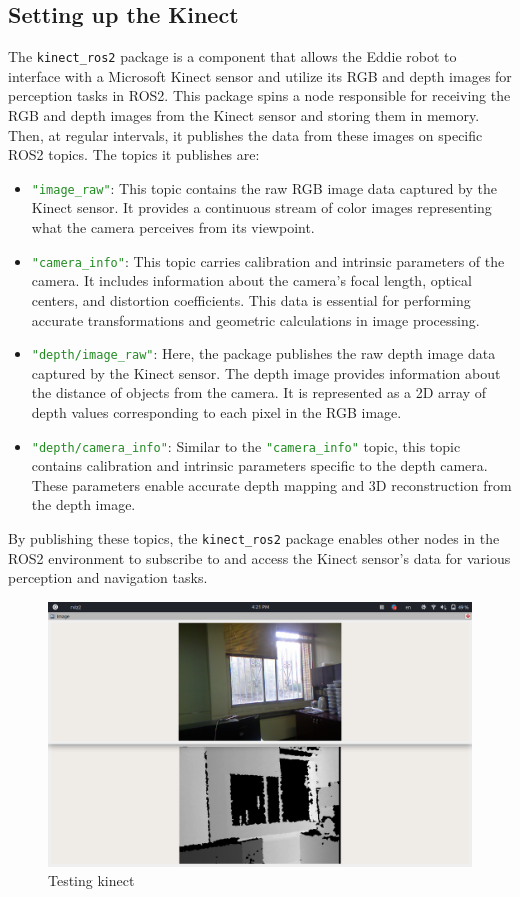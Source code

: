 \subsection{Setting up the Kinect}
The \texttt{kinect\_ros2} package is a component that allows the Eddie robot to interface with a Microsoft Kinect sensor and utilize its RGB and depth images for perception tasks in ROS2. This package spins a node responsible for receiving the RGB and depth images from the Kinect sensor and storing them in memory. Then, at regular intervals, it publishes the data from these images on specific ROS2 topics. The topics it publishes are:
\begin{itemize}
    \item \textcolor{ForestGreen}{\texttt{"image\_raw"}}: This topic contains the raw RGB image data captured by the Kinect sensor. It provides a continuous stream of color images representing what the camera perceives from its viewpoint.
    \item \textcolor{ForestGreen}{\texttt{"camera\_info"}}: This topic carries calibration and intrinsic parameters of the camera. It includes information about the camera's focal length, optical centers, and distortion coefficients. This data is essential for performing accurate transformations and geometric calculations in image processing.
    \item \textcolor{ForestGreen}{\texttt{"depth/image\_raw"}}: Here, the package publishes the raw depth image data captured by the Kinect sensor. The depth image provides information about the distance of objects from the camera. It is represented as a 2D array of depth values corresponding to each pixel in the RGB image.
    \item \textcolor{ForestGreen}{\texttt{"depth/camera\_info"}}: Similar to the \textcolor{ForestGreen}{\texttt{"camera\_info"}} topic, this topic contains calibration and intrinsic parameters specific to the depth camera. These parameters enable accurate depth mapping and 3D reconstruction from the depth image.
\end{itemize}
By publishing these topics, the \texttt{kinect\_ros2} package enables other nodes in the ROS2 environment to subscribe to and access the Kinect sensor's data for various perception and navigation tasks.

\begin{figure}[H]
	\centering
	\includegraphics[width=0.8\linewidth]{figures/kinect-test.png}
	\caption{Testing kinect}
	\label{fig:kinectTest}
\end{figure}

